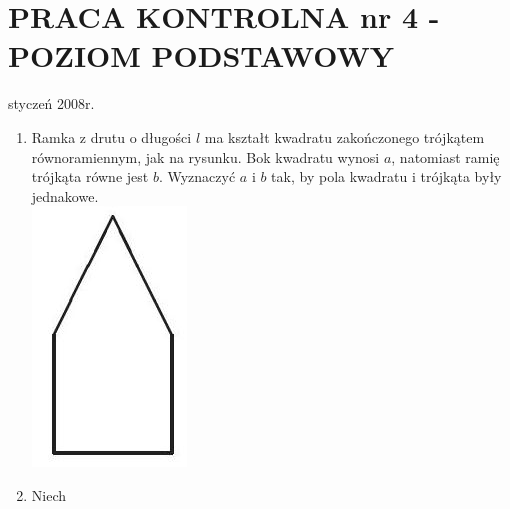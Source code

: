 \documentclass[10pt]{article}
\begin{document}
\section*{PRACA KONTROLNA nr 4 - POZIOM PODSTAWOWY}
styczeń 2008r.

\begin{enumerate}
  \item Ramka z drutu o długości $l$ ma kształt kwadratu zakończonego trójkątem równoramiennym, jak na rysunku. Bok kwadratu wynosi $a$, natomiast ramię trójkąta równe jest $b$. Wyznaczyć $a$ i $b$ tak, by pola kwadratu i trójkąta były jednakowe.\\
\includegraphics[max width=\textwidth, center]{2024_11_16_dea50acf0e4fa63c62acg-07}
  \item Niech
\end{enumerate}
\end{document}
